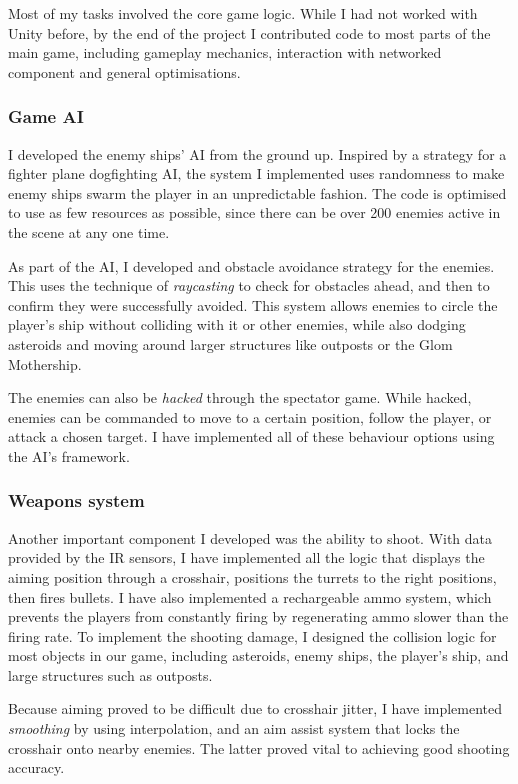 \documentclass[a4paper,11pt]{article}
\begin{document}
Most of my tasks involved the core game logic. While I had not worked with Unity before, by the end of the project I contributed code to most parts of the main game, including gameplay mechanics, interaction with networked component and general optimisations.

\subsubsection{Game AI}

I developed the enemy ships’ AI from the ground up. Inspired by a strategy for a fighter plane dogfighting AI, the system I implemented uses randomness to make enemy ships swarm the player in an unpredictable fashion. The code is optimised to use as few resources as possible, since there can be over 200 enemies active in the scene at any one time.

As part of the AI, I developed and obstacle avoidance strategy for the enemies. This uses the technique of \emph{raycasting} to check for obstacles ahead, and then to confirm they were successfully avoided. This system allows enemies to circle the player’s ship without colliding with it or other enemies, while also dodging asteroids and moving around larger structures like outposts or the Glom Mothership.

The enemies can also be \emph{hacked} through the spectator game. While hacked, enemies can be commanded to move to a certain position, follow the player, or attack a chosen target. I have implemented all of these behaviour options using the AI’s framework.

\subsubsection{Weapons system}

Another important component I developed was the ability to shoot. With data provided by the IR sensors, I have implemented all the logic that displays the aiming position through a crosshair, positions the turrets to the right positions, then fires bullets. I have also implemented a rechargeable ammo system, which prevents the players from constantly firing by regenerating ammo slower than the firing rate. To implement the shooting damage, I designed the collision logic for most objects in our game, including asteroids, enemy ships, the player’s ship, and large structures such as outposts.

Because aiming proved to be difficult due to crosshair jitter, I have implemented \emph{smoothing} by using interpolation, and an aim assist system that locks the crosshair onto nearby enemies. The latter proved vital to achieving good shooting accuracy.
\end{document}
